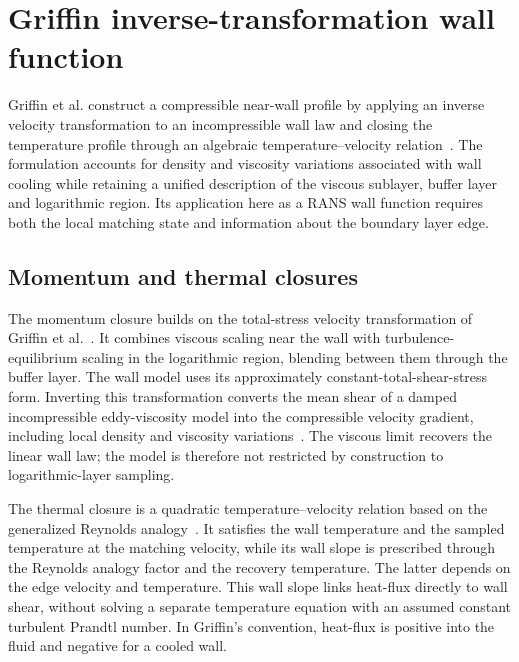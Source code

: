 \section{Griffin inverse-transformation wall function}
\label{sec:wall-functions:griffin}

Griffin et al. construct a compressible near-wall profile by applying an inverse velocity transformation to an incompressible wall law and closing the temperature profile through an algebraic temperature--velocity relation~\cite{griffin2022WFbrief,griffin2023WF}. The formulation accounts for density and viscosity variations associated with wall cooling while retaining a unified description of the viscous sublayer, buffer layer and logarithmic region. Its application here as a RANS wall function requires both the local matching state and information about the boundary layer edge.

\subsection{Momentum and thermal closures}
\label{subsec:wall-functions:griffin:governing-relations}

The momentum closure builds on the total-stress velocity transformation of Griffin et al.~\cite[Eqs.~(4)--(5)]{griffin2021Transformation}. It combines viscous scaling near the wall with turbulence-equilibrium scaling in the logarithmic region, blending between them through the buffer layer. The wall model uses its approximately constant-total-shear-stress form. Inverting this transformation converts the mean shear of a damped incompressible eddy-viscosity model into the compressible velocity gradient, including local density and viscosity variations~\cite[Eq.~(2.2)]{griffin2023WF}. The viscous limit recovers the linear wall law; the model is therefore not restricted by construction to logarithmic-layer sampling.
\par\medskip

The thermal closure is a quadratic temperature--velocity relation based on the generalized Reynolds analogy~\cite[Eq.~(2.5)]{griffin2023WF}. It satisfies the wall temperature and the sampled temperature at the matching velocity, while its wall slope is prescribed through the Reynolds analogy factor and the recovery temperature. The latter depends on the edge velocity and temperature. This wall slope links heat-flux directly to wall shear, without solving a separate temperature equation with an assumed constant turbulent Prandtl number. In Griffin's convention, heat-flux is positive into the fluid and negative for a cooled wall.
\par\medskip

